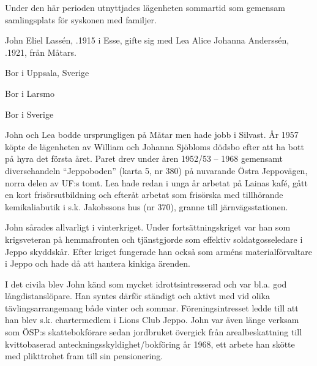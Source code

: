 %
Under den här perioden utnyttjades lägenheten sommartid som gemensam samlingsplats för syskonen med familjer.\jhvspace{}


%
John Eliel Lassén, .1915 i Esse, gifte sig med Lea Alice Johanna Anderssén, .1921, från Måtars.
\begin{jhchildren}
  \item {} Bor i Uppsala, Sverige
  \item {} Bor i Larsmo
  \item {}
  \item {} Bor i Sverige
  \item {}
\end{jhchildren}

John och Lea bodde ursprungligen på Måtar men hade jobb i Silvast. År 1957 köpte de lägenheten av William och Johanna Sjöbloms dödsbo efter att ha bott på hyra det första året. Paret drev under åren 1952/53 -- 1968 gemensamt diversehandeln ``Jeppoboden'' (karta 5, nr 380) på nuvarande Östra Jeppovägen, norra delen av UF:s tomt. Lea hade redan i unga år arbetat på Lainas kafé, gått en kort frisörsutbildning och efteråt arbetat som frisörska med tillhörande kemikaliabutik i s.k. Jakobssons hus (nr 370), granne till järnvägsstationen.

John sårades allvarligt i vinterkriget. Under fortsättningskriget var han som krigsveteran på hemmafronten och tjänstgjorde som effektiv soldatgosseledare i Jeppo skyddskår. Efter kriget fungerade han också som arméns materialförvaltare i Jeppo och hade då att hantera kinkiga ärenden.

I det civila blev John känd som mycket idrottsintresserad och var bl.a. god långdistanslöpare. Han syntes därför ständigt och aktivt med vid olika tävlingsarrangemang både vinter och sommar. Föreningsintresset ledde till att han blev s.k. chartermedlem i Lions Club Jeppo. John var även länge verksam som ÖSP:s  skattebokförare sedan jordbruket övergick från arealbeskattning till kvittobaserad anteckningsskyldighet/bokföring år 1968, ett arbete han skötte med plikttrohet fram till sin pensionering.

